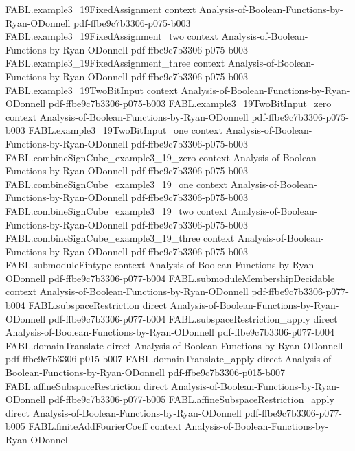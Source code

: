 \begin{theorem}
\proofstep
  {FABL.example3_19FixedAssignment}
  {context}
  {Analysis-of-Boolean-Functions-by-Ryan-ODonnell}
  {pdf-ffbe9c7b3306-p075-b003}
\proofstep
  {FABL.example3_19FixedAssignment_two}
  {context}
  {Analysis-of-Boolean-Functions-by-Ryan-ODonnell}
  {pdf-ffbe9c7b3306-p075-b003}
\proofstep
  {FABL.example3_19FixedAssignment_three}
  {context}
  {Analysis-of-Boolean-Functions-by-Ryan-ODonnell}
  {pdf-ffbe9c7b3306-p075-b003}
\proofstep
  {FABL.example3_19TwoBitInput}
  {context}
  {Analysis-of-Boolean-Functions-by-Ryan-ODonnell}
  {pdf-ffbe9c7b3306-p075-b003}
\proofstep
  {FABL.example3_19TwoBitInput_zero}
  {context}
  {Analysis-of-Boolean-Functions-by-Ryan-ODonnell}
  {pdf-ffbe9c7b3306-p075-b003}
\proofstep
  {FABL.example3_19TwoBitInput_one}
  {context}
  {Analysis-of-Boolean-Functions-by-Ryan-ODonnell}
  {pdf-ffbe9c7b3306-p075-b003}
\proofstep
  {FABL.combineSignCube_example3_19_zero}
  {context}
  {Analysis-of-Boolean-Functions-by-Ryan-ODonnell}
  {pdf-ffbe9c7b3306-p075-b003}
\proofstep
  {FABL.combineSignCube_example3_19_one}
  {context}
  {Analysis-of-Boolean-Functions-by-Ryan-ODonnell}
  {pdf-ffbe9c7b3306-p075-b003}
\proofstep
  {FABL.combineSignCube_example3_19_two}
  {context}
  {Analysis-of-Boolean-Functions-by-Ryan-ODonnell}
  {pdf-ffbe9c7b3306-p075-b003}
\proofstep
  {FABL.combineSignCube_example3_19_three}
  {context}
  {Analysis-of-Boolean-Functions-by-Ryan-ODonnell}
  {pdf-ffbe9c7b3306-p075-b003}
\proofstep
  {FABL.submoduleFintype}
  {context}
  {Analysis-of-Boolean-Functions-by-Ryan-ODonnell}
  {pdf-ffbe9c7b3306-p077-b004}
\proofstep
  {FABL.submoduleMembershipDecidable}
  {context}
  {Analysis-of-Boolean-Functions-by-Ryan-ODonnell}
  {pdf-ffbe9c7b3306-p077-b004}
\proofstep
  {FABL.subspaceRestriction}
  {direct}
  {Analysis-of-Boolean-Functions-by-Ryan-ODonnell}
  {pdf-ffbe9c7b3306-p077-b004}
\proofstep
  {FABL.subspaceRestriction_apply}
  {direct}
  {Analysis-of-Boolean-Functions-by-Ryan-ODonnell}
  {pdf-ffbe9c7b3306-p077-b004}
\proofstep
  {FABL.domainTranslate}
  {direct}
  {Analysis-of-Boolean-Functions-by-Ryan-ODonnell}
  {pdf-ffbe9c7b3306-p015-b007}
\proofstep
  {FABL.domainTranslate_apply}
  {direct}
  {Analysis-of-Boolean-Functions-by-Ryan-ODonnell}
  {pdf-ffbe9c7b3306-p015-b007}
\proofstep
  {FABL.affineSubspaceRestriction}
  {direct}
  {Analysis-of-Boolean-Functions-by-Ryan-ODonnell}
  {pdf-ffbe9c7b3306-p077-b005}
\proofstep
  {FABL.affineSubspaceRestriction_apply}
  {direct}
  {Analysis-of-Boolean-Functions-by-Ryan-ODonnell}
  {pdf-ffbe9c7b3306-p077-b005}
\proofstep
  {FABL.finiteAddFourierCoeff}
  {context}
  {Analysis-of-Boolean-Functions-by-Ryan-ODonnell}

\end{theorem}
